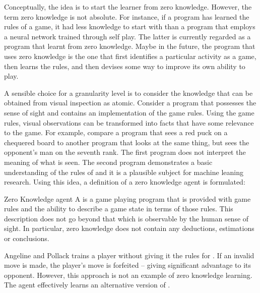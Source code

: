 Conceptually, the idea is to start the learner from zero knowledge.  However, the term zero knowledge is not absolute.  For instance, if a program has learned the rules of a game, it had less knowledge to start with than a program that employs a neural network trained through self play.  The latter  is currently regarded as a program that learnt from zero knowledge. Maybe in the future, the program that uses zero knowledge is the one that first identifies a particular activity as a game, then learns the rules, and then devises some way to improve its own ability to play.  

A sensible choice for a granularity level is to consider the knowledge that can be obtained from visual inspection as atomic.  Consider a program that possesses the sense of sight and contains an implementation of the game rules.  Using the game rules, visual observations can be transformed into facts that have some relevance to the game.  For example, compare a program that sees a red puck on a chequered board to another program that looks at the same thing, but sees the opponent's man on the seventh rank.  The first program does not interpret the meaning of what is seen. The second program demonstrates a basic understanding of the rules of  and it is a plausible subject for machine leaning research.  Using this idea, a definition of a zero knowledge agent is formulated:

\begin{definition} {Zero Knowledge agent}
\label{def:zero}\newline
A  is a game playing program that is provided with game rules and the ability to describe a game state in terms of those rules.  This description does not go beyond that which is observable by the human sense of sight.  In particular, zero knowledge does not contain any deductions, estimations or conclusions. 
\end{definition}

Angeline and Pollack \cite{angeline:evolve} trains a  player without giving it the rules for .  If an invalid move is made, the player's move is forfeited -- giving significant advantage to its opponent. However, this approach is not an example of zero knowledge learning. The agent effectively learns an alternative version of .



